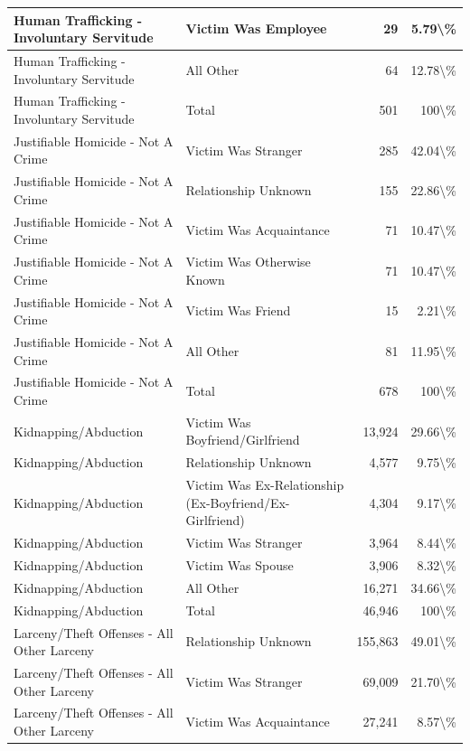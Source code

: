 \documentclass[
]{krantz}
\begin{document}
\begin{longtable}[t]{l|l|r|r}
\hline
Human Trafficking - Involuntary Servitude & Victim Was Employee & 29 & 5.79\textbackslash{}\%\\
\hline
Human Trafficking - Involuntary Servitude & All Other & 64 & 12.78\textbackslash{}\%\\
\hline
Human Trafficking - Involuntary Servitude & Total & 501 & 100\textbackslash{}\%\\
\hline
Justifiable Homicide - Not A Crime & Victim Was Stranger & 285 & 42.04\textbackslash{}\%\\
\hline
Justifiable Homicide - Not A Crime & Relationship Unknown & 155 & 22.86\textbackslash{}\%\\
\hline
Justifiable Homicide - Not A Crime & Victim Was Acquaintance & 71 & 10.47\textbackslash{}\%\\
\hline
Justifiable Homicide - Not A Crime & Victim Was Otherwise Known & 71 & 10.47\textbackslash{}\%\\
\hline
Justifiable Homicide - Not A Crime & Victim Was Friend & 15 & 2.21\textbackslash{}\%\\
\hline
Justifiable Homicide - Not A Crime & All Other & 81 & 11.95\textbackslash{}\%\\
\hline
Justifiable Homicide - Not A Crime & Total & 678 & 100\textbackslash{}\%\\
\hline
Kidnapping/Abduction & Victim Was Boyfriend/Girlfriend & 13,924 & 29.66\textbackslash{}\%\\
\hline
Kidnapping/Abduction & Relationship Unknown & 4,577 & 9.75\textbackslash{}\%\\
\hline
Kidnapping/Abduction & Victim Was Ex-Relationship (Ex-Boyfriend/Ex-Girlfriend) & 4,304 & 9.17\textbackslash{}\%\\
\hline
Kidnapping/Abduction & Victim Was Stranger & 3,964 & 8.44\textbackslash{}\%\\
\hline
Kidnapping/Abduction & Victim Was Spouse & 3,906 & 8.32\textbackslash{}\%\\
\hline
Kidnapping/Abduction & All Other & 16,271 & 34.66\textbackslash{}\%\\
\hline
Kidnapping/Abduction & Total & 46,946 & 100\textbackslash{}\%\\
\hline
Larceny/Theft Offenses - All Other Larceny & Relationship Unknown & 155,863 & 49.01\textbackslash{}\%\\
\hline
Larceny/Theft Offenses - All Other Larceny & Victim Was Stranger & 69,009 & 21.70\textbackslash{}\%\\
\hline
Larceny/Theft Offenses - All Other Larceny & Victim Was Acquaintance & 27,241 & 8.57\textbackslash{}\%\\

\end{longtable}
\end{document}
